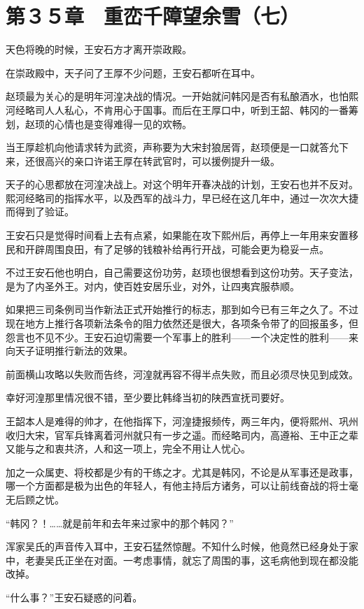 \section{第３５章　重峦千障望余雪（七）}

天色将晚的时候，王安石方才离开崇政殿。

在崇政殿中，天子问了王厚不少问题，王安石都听在耳中。

赵顼最为关心的是明年河湟决战的情况。一开始就问韩冈是否有私酿酒水，也怕熙河经略司人人私心，不肯用心于国事。而后在王厚口中，听到王韶、韩冈的一番筹划，赵顼的心情也是变得难得一见的欢畅。

当王厚趁机向他请求转为武资，声称要为大宋封狼居胥，赵顼便是一口就答允下来，还很高兴的亲口许诺王厚在转武官时，可以援例提升一级。

天子的心思都放在河湟决战上。对这个明年开春决战的计划，王安石也并不反对。熙河经略司的指挥水平，以及西军的战斗力，早已经在这几年中，通过一次次大捷而得到了验证。

王安石只是觉得时间看上去有点紧，如果能在攻下熙州后，再停上一年用来安置移民和开辟周围良田，有了足够的钱粮补给再行开战，可能会更为稳妥一点。

不过王安石他也明白，自己需要这份功劳，赵顼也很想看到这份功劳。天子变法，是为了内圣外王。对内，使百姓安居乐业，对外，让四夷宾服恭顺。

如果把三司条例司当作新法正式开始推行的标志，那到如今已有三年之久了。不过现在地方上推行各项新法条令的阻力依然还是很大，各项条令带了的回报虽多，但怨言也不见不少。王安石迫切需要一个军事上的胜利——一个决定性的胜利——来向天子证明推行新法的效果。

前面横山攻略以失败而告终，河湟就再容不得半点失败，而且必须尽快见到成效。

幸好河湟那里情况很不错，至少要比韩绛当初的陕西宣抚司要好。

王韶本人是难得的帅才，在他指挥下，河湟捷报频传，两三年内，便将熙州、巩州收归大宋，官军兵锋离着河州就只有一步之遥。而经略司内，高遵裕、王中正之辈又能与之和衷共济，人和这一项上，完全不用让人忧心。

加之一众属吏、将校都是少有的干练之才。尤其是韩冈，不论是从军事还是政事，哪一个方面都是极为出色的年轻人，有他主持后方诸务，可以让前线奋战的将士毫无后顾之忧。

“韩冈？！……就是前年和去年来过家中的那个韩冈？”

浑家吴氏的声音传入耳中，王安石猛然惊醒。不知什么时候，他竟然已经身处于家中，老妻吴氏正坐在对面。一考虑事情，就忘了周围的事，这毛病他到现在都没能改掉。

“什么事？”王安石疑惑的问着。

